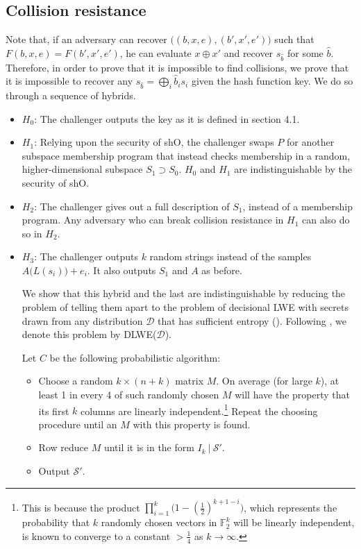 \documentclass{article}
\begin{document}
\subsection{Collision resistance}
Note that, if an adversary can recover $\big( (b, x, e), (b', x', e') \big)$ such that $F(b, x, e) = F(b', x', e')$, he can evaluate $x \oplus x'$ and recover $s_{\hat b}$ for some $\hat b$. Therefore, in order to prove that it is impossible to find collisions, we prove that it is impossible to recover any $s_{\hat b} = \bigoplus_i \hat b_is_i$ given the hash function key. We do so through a sequence of hybrids.

\begin{itemize}
    \item $H_0$: The challenger outputs the key as it is defined in section 4.1.
    \item $H_1$: Relying upon the security of \textsf{shO}, the challenger swaps $P$ for another subspace membership program that instead checks membership in a random, higher-dimensional subspace $S_1 \supset S_0$. $H_0$ and $H_1$ are indistinguishable by the security of \textsf{shO}.
    \item $H_2$: The challenger gives out a full description of $S_1$, instead of a membership program. Any adversary who can break collision resistance in $H_1$ can also do so in $H_2$.
    \item $H_3$: The challenger outputs $k$ random strings instead of the samples $A\big( L(s_i) \big) + e_i$. It also outputs $S_1$ and $A$ as before.

We show that this hybrid and the last are indistinguishable by reducing the problem of telling them apart to the problem of decisional LWE with secrets drawn from any distribution $\mathcal{D}$ that has sufficient entropy (\cite{robustness}). Following \cite{robustness}, we denote this problem by \textsf{DLWE}($\mathcal{D}$).

	  Let $C$ be the following probabilistic algorithm:
    \begin{itemize}
        \item Choose a random $k \times (n+k)$ matrix $M$. On average (for large $k$), at least 1 in every 4 of such randomly chosen $M$ will have the property that its first $k$ columns are linearly independent.\footnote{This is because the product $\prod_{i=1}^k \big(1-(\frac{1}{2})^{k+1-i}\big)$, which represents the probability that $k$ randomly chosen vectors in $\mathbb{F}_2^k$ will be linearly independent, is known to converge to a constant $ > \frac{1}{4}$ as $k \rightarrow \infty$.} Repeat the choosing procedure until an $M$ with this property is found.
        \item Row reduce $M$ until it is in the form $I_k \: | \: \mathcal{S}'$.
        \item Output $\mathcal{S}'$.
    \end{itemize}


\end{itemize}
\end{document}

